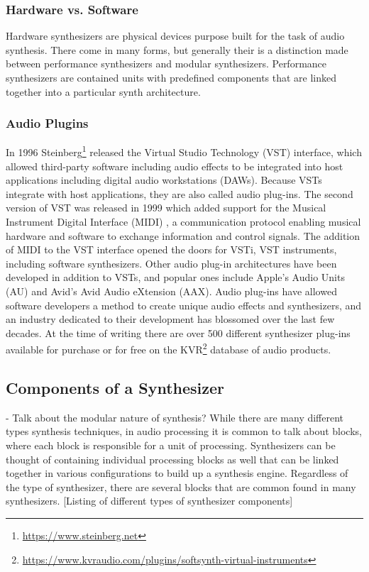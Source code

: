 \subsubsection{Hardware vs. Software}
Hardware synthesizers are physical devices purpose built for the task of audio synthesis. There come in many forms, but generally their is a distinction made between performance synthesizers and modular synthesizers. Performance synthesizers are contained units with predefined components that are linked together into a particular synth architecture.

\subsubsection{Audio Plugins}
In 1996 Steinberg\footnote{\url{https://www.steinberg.net}} released the Virtual Studio Technology (VST) interface, which allowed third-party software including audio effects to be integrated into host applications including digital audio workstations (DAWs). Because VSTs integrate with host applications, they are also called audio plug-ins. The second version of VST was released in 1999 which added support for the Musical Instrument Digital Interface (MIDI) \cite{rothstein1992midi}, a communication protocol enabling musical hardware and software to exchange information and control signals. The addition of MIDI to the VST interface opened the doors for VSTi, VST instruments, including software synthesizers. Other audio plug-in architectures have been developed in addition to VSTs, and popular ones include Apple's Audio Units (AU) and Avid's Avid Audio eXtension (AAX). Audio plug-ins have allowed software developers a method to create unique audio effects and synthesizers, and an industry dedicated to their development has blossomed over the last few decades. At the time of writing there are over 500 different synthesizer plug-ins available for purchase or for free on the KVR\footnote{\url{https://www.kvraudio.com/plugins/softsynth-virtual-instruments}} database of audio products.

\subsection{Components of a Synthesizer}
- Talk about the modular nature of synthesis? While there are many different types synthesis techniques, in audio processing it is common to talk about blocks, where each block is responsible for a unit of processing. Synthesizers can be thought of containing individual processing blocks as well that can be linked together in various configurations to build up a synthesis engine. Regardless of the type of synthesizer, there are several blocks that are common found in many synthesizers. [Listing of different types of synthesizer components]


